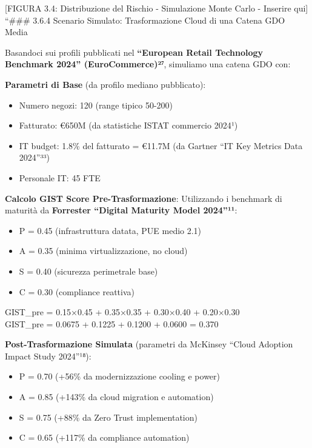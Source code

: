 \documentclass{report}
\begin{document}
{[}FIGURA 3.4: Distribuzione del Rischio - Simulazione Monte Carlo -
Inserire qui{]} ``\#\#\# 3.6.4 Scenario Simulato: Trasformazione Cloud
di una Catena GDO Media

Basandoci sui profili pubblicati nel \textbf{``European Retail
Technology Benchmark 2024'' (EuroCommerce)²⁷}, simuliamo una catena GDO
con:

\textbf{Parametri di Base} (da profilo mediano pubblicato):

\begin{itemize}
\tightlist
\item
  Numero negozi: 120 (range tipico 50-200)\\
\item
  Fatturato: €650M (da statistiche ISTAT commercio 2024¹)\\
\item
  IT budget: 1.8\% del fatturato = €11.7M (da Gartner ``IT Key Metrics
  Data 2024''³³)\\
\item
  Personale IT: 45 FTE
\end{itemize}

\textbf{Calcolo GIST Score Pre-Trasformazione}: Utilizzando i benchmark
di maturità da \textbf{Forrester ``Digital Maturity Model 2024''¹¹}:

\begin{itemize}
\tightlist
\item
  P = 0.45 (infrastruttura datata, PUE medio 2.1)\\
\item
  A = 0.35 (minima virtualizzazione, no cloud)\\
\item
  S = 0.40 (sicurezza perimetrale base)\\
\item
  C = 0.30 (compliance reattiva)
\end{itemize}

GIST\_pre = 0.15×0.45 + 0.35×0.35 + 0.30×0.40 + 0.20×0.30\\
GIST\_pre = 0.0675 + 0.1225 + 0.1200 + 0.0600 = 0.370

\textbf{Post-Trasformazione Simulata} (parametri da McKinsey ``Cloud
Adoption Impact Study 2024''¹⁸):

\begin{itemize}
\tightlist
\item
  P = 0.70 (+56\% da modernizzazione cooling e power)\\
\item
  A = 0.85 (+143\% da cloud migration e automation)\\
\item
  S = 0.75 (+88\% da Zero Trust implementation)\\
\item
  C = 0.65 (+117\% da compliance automation)
\end{itemize}
\end{document}
